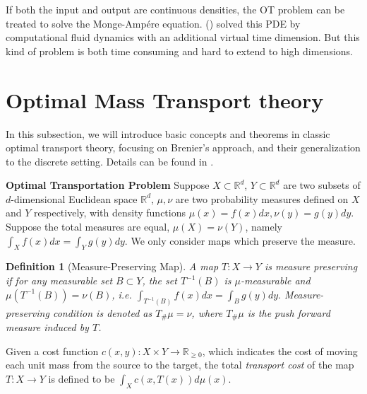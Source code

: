 \documentclass{article}
\newtheorem{definition}[theorem]{Definition}
\begin{document}
If both the input and output are continuous densities, the OT problem can be treated to solve the Monge-Amp{\'e}re equation. (\cite{Benamou2002CFM,Benamou2014NumSolution,Papadakis2014ProSplit}) solved this PDE by computational fluid dynamics with an additional virtual time dimension. But this kind of problem is both time consuming and hard to extend to high dimensions.



\section{Optimal Mass Transport theory}
\label{sec:theory}

In this subsection, we will introduce basic concepts and theorems in classic optimal transport theory, focusing on Brenier's approach, and their generalization to the discrete setting. Details can be found in \cite{villani2008optimal}.

\noindent\textbf{Optimal Transportation Problem} 
Suppose $X\subset \mathbb{R}^d$, $Y\subset \mathbb{R}^d$  are two subsets of $d$-dimensional Euclidean space $\mathbb{R}^d$, $\mu, \nu$ are two probability measures defined on $X$ and $Y$ respectively, with density functions
$
\mu(x)= f(x)dx, \nu(y)=g(y)dy.
$
Suppose the total measures are equal, $\mu(X)=\nu(Y)$, namely
$%
    \int_X f(x)dx = \int_Y g(y)dy.
$%
We only consider maps which preserve the measure.
\begin{definition}[Measure-Preserving Map]
\label{def:omt}
A map $T: X\to Y$ is \emph{measure preserving} if for any measurable set $B\subset Y$, the set $T^{-1}(B)$ is $\mu$-measurable and $\mu(T^{-1}(B))=\nu(B)$, i.e.
$%
    \int_{T^{-1}(B)} f(x)dx = \int_B g(y) dy.
$%
Measure-preserving condition is denoted as $T_\#\mu = \nu$, where $T_\#\mu$ is the push forward measure induced by $T$.
\end{definition}
 

Given a cost function $c(x,y):X\times Y\to \mathbb{R}_{\ge 0}$, which indicates the cost of moving each unit mass from the source to the target,
the total {\it transport cost} of the map $T:X\to Y$ is defined to be $\int_X c(x,T(x)) d\mu(x)$.
\end{document}
